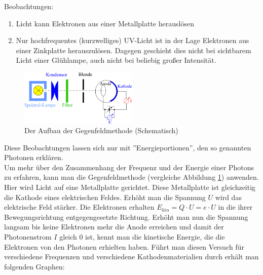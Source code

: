 \documentclass[a4paper]{article}
\begin{document}
				Beobachtungen:
				\begin{enumerate}
					\item Licht kann Elektronen aus einer Metallplatte herauslösen
					\item Nur hochfrequentes (kurzwelliges) UV-Licht ist in der Lage Elektronen aus einer Zinkplatte herauszulösen. Dagegen geschieht dies nicht bei sichtbarem Licht einer Glühlampe, auch nicht bei beliebig großer Intensität.
				\end{enumerate}
				\begin{figure}[H]
					\centering
					\includegraphics[width=0.5\textwidth]{img/gegenfeld03_quantenobjektp_ver.png}
					\caption{Der Aufbau der Gegenfeldmethode (Schematisch)}
					\label{img:gegenfeld03_quantenobjektp_ver}
				\end{figure}
				Diese Beobachtungen lassen sich nur mit ''Energieportionen'', den so genannten Photonen erklären. \\
				Um mehr über den Zusammenhang der Frequenz und der Energie einer Photons zu erfahren, kann man die Gegenfeldmethode (vergleiche Abbildung \ref{img:gegenfeld03_quantenobjektp_ver}) anwenden. Hier wird Licht auf eine Metallplatte gerichtet. Diese Metallplatte ist gleichzeitig die Kathode eines elektrischen Feldes. Erhöht man die Spannung $U$ wird das elektrische Feld stärker. Die Elektronen erhalten $E_{kin}=Q\cdot U = e\cdot U$ in die ihrer Bewegungsrichtung entgegengesetzte Richtung. Erhöht man nun die Spannung langsam bis keine Elektronen mehr die Anode erreichen und damit der Photonenstrom $I$ gleich $0$ ist, kennt man die kinetische Energie, die die Elektronen von den Photonen erhielten haben. Führt man diesen Versuch für verschiedene Frequenzen und verschiedene Kathodenmaterialien durch erhält man folgenden Graphen:
				
\end{document}
